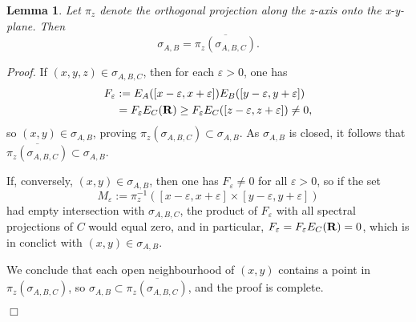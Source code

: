 \documentclass[a4paper,11pt]{article}
\newtheorem{lemma}[theorem]{Lemma}{\bf}{\it}
\def\eps{\varepsilon}
\def\Halmos{\quad\hfill$\Box$}
\def\reals{{\bf R}}
\begin{document}
\begin{appendix}
\begin{lemma}\label{projection}
Let $\pi_z$ denote the orthogonal projection along the z-axis onto
the x-y-plane. Then
$$\sigma_{A,B}=\overline{\pi_z(\sigma_{A,B,C})}.$$
\end{lemma}
{\it Proof.} If $(x,y,z)\in\sigma_{A,B,C}$, then for each $\eps>0$,
one has
\begin{align*}
F_\eps&:=E_A([x-\eps,x+\eps])E_B([y-\eps,y+\eps])\\
&=F_\eps E_C(\reals)\geq F_\eps E_C([z-\eps,z+\eps])\not=0,
\end{align*}
so $(x,y)\in\sigma_{A,B}$, proving
$\pi_z(\sigma_{A,B,C})\subset\sigma_{A,B}$. As $\sigma_{A,B}$ is closed,
it follows that $\overline{\pi_z(\sigma_{A,B,C})}\subset\sigma_{A,B}$.

If, conversely, $(x,y)\in\sigma_{A,B}$, then one has
$F_\eps\not=0$ for all $\eps>0$, so if the set
$$M_\eps:=\pi_z^{-1}([x-\eps,x+\eps]\times[y-\eps,y+\eps])$$
had empty intersection with $\sigma_{A,B,C}$,
the product of $F_\eps$ with all spectral projections of $C$
would equal zero, and in particular, $F_\eps=F_\eps E_C(\reals)=0$,
which is in conclict with $(x,y)\in\sigma_{A,B}$.

We conclude that each open neighbourhood of $(x,y)$ contains a point in
$\pi_z(\sigma_{A,B,C})$, so
$\sigma_{A,B}\subset\overline{\pi_z(\sigma_{A,B,C})}$, and the
proof is complete.

\Halmos




\end{appendix}
\end{document}
